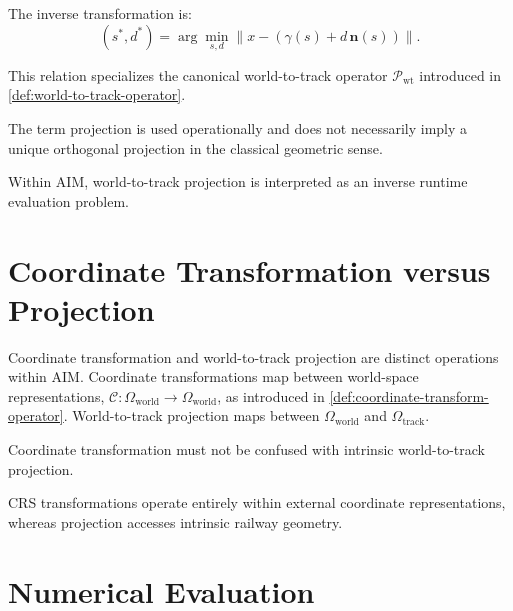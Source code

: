 \begin{definition}
\label{def:state-world-to-track-runtime}
The inverse transformation is:
\begin{equation}
(s^\ast,d^\ast)
=
\arg\min_{s,d}
\|
x-(\gamma(s)+d\,\mathbf n(s))
\|.
\label{eq:state-world-to-track-runtime}
\end{equation}
\end{definition}

This relation specializes the canonical world-to-track operator
\(\mathcal P_{\mathrm{wt}}\) introduced in
\cref{def:world-to-track-operator}.

The term projection is used operationally and does not necessarily imply
a unique orthogonal projection in the classical geometric sense.

Within AIM, world-to-track projection is interpreted as an inverse
runtime evaluation problem.

\section{Coordinate Transformation versus Projection}


Coordinate transformation and world-to-track projection are distinct
operations within AIM. Coordinate transformations map between world-space
representations, \(\mathcal C:\Omega_{\mathrm{world}}\to\Omega_{\mathrm{world}}\),
as introduced in \cref{def:coordinate-transform-operator}. World-to-track
projection maps between \(\Omega_{\mathrm{world}}\) and
\(\Omega_{\mathrm{track}}\).

\begin{principle}
\label{princ:projection-distinction}
Coordinate transformation must not be confused with intrinsic
world-to-track projection.
\end{principle}

CRS transformations operate entirely within external coordinate
representations, whereas projection accesses intrinsic railway geometry.

\section{Numerical Evaluation}

